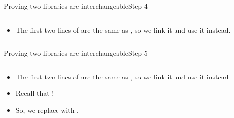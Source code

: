 \documentclass[aspectratio=169, lualatex, handout]{beamer}
\begin{document}
\begin{frame}{Proving two libraries are interchangeable}{Step 4}
	\begin{columns}[c]
		\begin{column}{0.5\textwidth}
			\begin{itemize}[<+->]
				\item The first two lines of  are the same as , so we link it and use it instead.
			\end{itemize}
		\end{column}
		\begin{column}{0.5\textwidth}
			\begin{center}
			\end{center}
		\end{column}
	\end{columns}
\end{frame}

\begin{frame}{Proving two libraries are interchangeable}{Step 5}
	\begin{columns}[c]
		\begin{column}{0.5\textwidth}
			\begin{itemize}
				\item The first two lines of  are the same as , so we link it and use it instead.
				\item Recall that  \interchangeable{} !
				\item So, we replace  with .
			\end{itemize}
		\end{column}
		\begin{column}{0.5\textwidth}
			\begin{center}
			\end{center}
		\end{column}
	\end{columns}
\end{frame}
\end{document}
